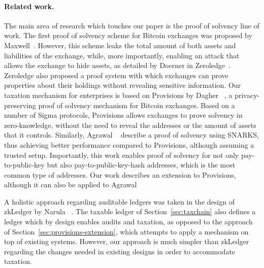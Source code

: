\paragraph{Related work.}\label{sec:related}

The main area of research which touches our paper is the proof of solvency line
of work. The first proof of solvency scheme for Bitcoin exchanges was proposed
by Maxwell~\cite{wilcox2014proving}. However, this scheme leaks the total
amount of both assets and liabilities of the exchange, while, more importantly,
enabling an attack that allows the exchange to hide assets, as detailed by
Doerner \etal in Zeroledge~\cite{doernerzeroledge}. Zeroledge also proposed a
proof system with which exchanges can prove properties about their holdings
without revealing sensitive information. Our taxation mechanism for enterprises
is based on Provisions by Dagher \etal~\cite{CCS:DBBCB15}, a
privacy-preserving proof of solvency mechanism for Bitcoin exchanges. Based on
a number of Sigma protocols, Provisions allows exchanges to prove solvency in
zero-knowledge, \ie without the need to reveal the addresses or the amount of
assets that it controls. Similarly, Agrawal \etal~\cite{C:AgrGanMoh18} describe
a proof of solvency using SNARKS, thus achieving better performance compared to
Provisions, although assuming a trusted setup. Importantly, this work enables
proof of solvency for not only pay-to-public-key but also
pay-to-public-key-hash addresses, which is the most common type of addresses.
Our work describes an extension to Provisions, although it can also be applied
to Agrawal \etal

A holistic approach regarding auditable ledgers was taken in the design of
zkLedger by Narula \etal~\cite{EPRINT:NarVasVir18}. The taxable ledger of
Section~\ref{sec:taxchain} also defines a ledger which by design enables audits
and taxation, as opposed to the approach of
Section~\ref{sec:provisions-extension}, which attempts to apply a mechanism on
top of existing systems. However, our approach is much simpler than zkLedger
regarding the changes needed in existing designs in order to accommodate
taxation.
